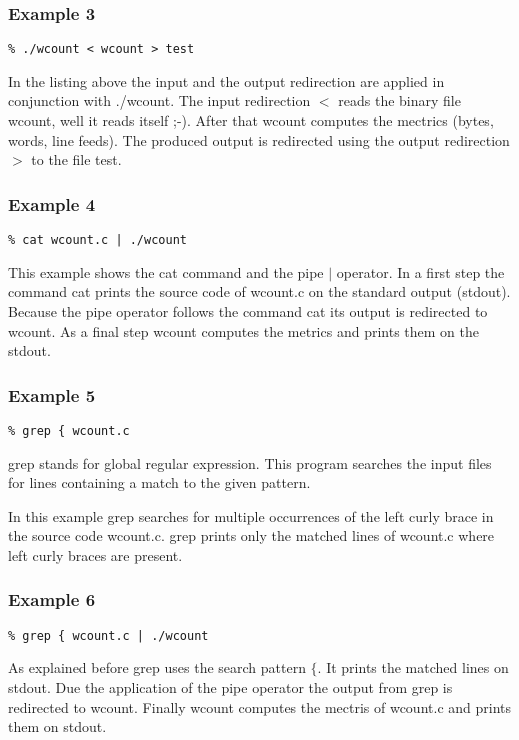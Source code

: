 \documentclass[12pt]{article}
\begin{document}
\subsubsection*{Example 3}
\begin{lstlisting}
% ./wcount < wcount > test
\end{lstlisting}
In the listing above the input and the output redirection are applied in conjunction with ./wcount.  
The input redirection $<$ reads the binary file wcount, well it reads itself ;-).  
After that wcount computes the mectrics (bytes, words, line feeds). 
The produced output is redirected using the output redirection $>$ to the file test. 


\subsubsection*{Example 4}
\begin{lstlisting}
% cat wcount.c | ./wcount
\end{lstlisting}
This example shows the cat command and the pipe $|$ operator.  
In a first step the command cat prints the source code of wcount.c on the standard output (stdout).  
Because the pipe operator follows the command cat its output is redirected to  wcount.
As a final step wcount computes the metrics and prints them on the stdout.


\subsubsection*{Example 5}
\begin{lstlisting}
% grep { wcount.c
\end{lstlisting}
grep stands for global regular expression. This program searches the input files for lines containing a match to the given pattern.  
  
In this example grep searches for multiple occurrences of the left curly brace in the source code wcount.c.  
grep prints only the matched lines of wcount.c where left curly braces are present.


\subsubsection*{Example 6}
\begin{lstlisting}
% grep { wcount.c | ./wcount
\end{lstlisting}
As explained before grep uses the search pattern $\{$.  
It prints the matched lines on stdout. Due the application of the pipe operator the output from grep is redirected to wcount. Finally wcount computes the mectris of wcount.c and prints them on stdout.
\end{document}
